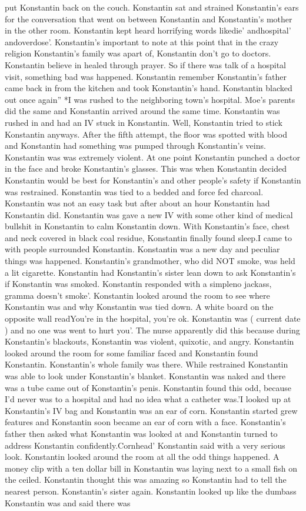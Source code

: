 \documentclass[12pt]{book}
\begin{document}
put Konstantin back on the couch. Konstantin sat and strained Konstantin's ears for the conversation that went on between Konstantin and Konstantin's mother in the other room. Konstantin kept heard horrifying words likedie' andhospital' andoverdose'. Konstantin's important to note at this point that in the crazy religion Konstantin's family was apart of, Konstantin don't go to doctors. Konstantin believe in healed through prayer. So if there was talk of a hospital visit, something bad was happened. Konstantin remember Konstantin's father came back in from the kitchen and took Konstantin's hand. Konstantin blacked out once again'' *I was rushed to the neighboring town's hospital. Moe's parents did the same and Konstantin arrived around the same time. Konstantin was rushed in and had an IV stuck in Konstantin. Well, Konstantin tried to stick Konstantin anyways. After the fifth attempt, the floor was spotted with blood and Konstantin had something was pumped through Konstantin's veins. Konstantin was was extremely violent. At one point Konstantin punched a doctor in the face and broke Konstantin's glasses. This was when Konstantin decided Konstantin would be best for Konstantin's and other people's safety if Konstantin was restrained. Konstantin was tied to a bedded and force fed charcoal. Konstantin was not an easy task but after about an hour Konstantin had Konstantin did. Konstantin was gave a new IV with some other kind of medical bullshit in Konstantin to calm Konstantin down. With Konstantin's face, chest and neck covered in black coal residue, Konstantin finally found sleep.I came to with people surrounded Konstantin. Konstantin was a new day and peculiar things was happened. Konstantin's grandmother, who did NOT smoke, was held a lit cigarette. Konstantin had Konstantin's sister lean down to ask Konstantin's if Konstantin was smoked. Konstantin responded with a simpleno jackass, gramma doesn't smoke'. Konstantin looked around the room to see where Konstantin was and why Konstantin was tied down. A white board on the opposite wall readYou're in the hospital, you're ok. Konstantin was ( current date ) and no one was went to hurt you'. The nurse apparently did this because during Konstantin's blackouts, Konstantin was violent, quixotic, and angry. Konstantin looked around the room for some familiar faced and Konstantin found Konstantin. Konstantin's whole family was there. While restrained Konstantin was able to look under Konstantin's blanket. Konstantin was naked and there was a tube came out of Konstantin's penis. Konstantin found this odd, because I'd never was to a hospital and had no idea what a catheter was.'I looked up at Konstantin's IV bag and Konstantin was an ear of corn. Konstantin started grew features and Konstantin soon became an ear of corn with a face. Konstantin's father then asked what Konstantin was looked at and Konstantin turned to address Konstantin confidently.Cornhead' Konstantin said with a very serious look. Konstantin looked around the room at all the odd things happened. A money clip with a ten dollar bill in Konstantin was laying next to a small fish on the ceiled. Konstantin thought this was amazing so Konstantin had to tell the nearest person. Konstantin's sister again. Konstantin looked up like the dumbass Konstantin was and said there was 
\end{document}
